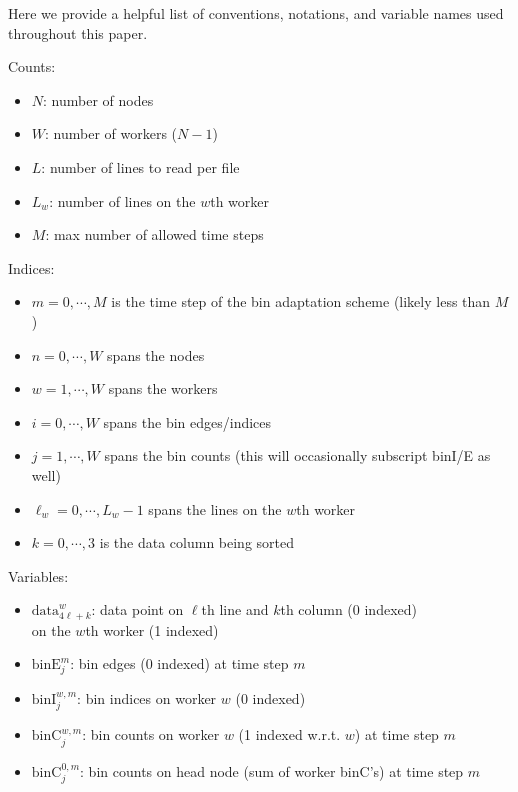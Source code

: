 \documentclass{article}
\begin{document}
Here we provide a helpful list of conventions, notations, and variable names used throughout this paper.

\begin{mdframed}[backgroundcolor=blue!20]
	Counts:
	\setlength\itemsep{0.1pt}
	\setlength\parskip{0.1pt}
	\begin{itemize}
		\setlength\itemsep{0.1pt}
		\setlength\parskip{0.1pt}
		\item $N$: number of nodes
		\item $W$: number of workers ($N-1$)
		\item $L$: number of lines to read per file
		\item $L_w$: number of lines on the $w$th worker
		\item $M$: max number of allowed time steps
	\end{itemize}
\end{mdframed}

\begin{mdframed}[backgroundcolor=blue!20]
	Indices:
	\setlength\itemsep{0.1pt}
	\setlength\parskip{0.1pt}
	\begin{itemize}
		\setlength\itemsep{0.1pt}
		\setlength\parskip{0.1pt}
		\item $m = 0, \cdots, M$ is the time step of the bin adaptation scheme (likely less than $M$)
		\item $n = 0, \cdots, W$ spans the nodes
		\item $w = 1, \cdots, W$ spans the workers
		\item $i = 0, \cdots, W$ spans the bin edges/indices
		\item $j = 1, \cdots, W$ spans the bin counts (this will occasionally subscript binI/E as well)
		\item $\ell_w = 0, \cdots, L_w-1$ spans the lines on the $w$th worker
		\item $k = 0, \cdots, 3$ is the data column being sorted
	\end{itemize}
\end{mdframed}

\begin{mdframed}[backgroundcolor=blue!20]
	Variables:
	\setlength\itemsep{0.1pt}
	\setlength\parskip{0.1pt}
	\begin{itemize}
		\setlength\itemsep{0.1pt}
		\setlength\parskip{0.1pt}
		\item $\textrm{data}^w_{4\ell+k}$: data point on $\ell$th line and $k$th column (0 indexed)\\ on the $w$th worker (1 indexed)
		\item $\textrm{binE}^m_j$: bin edges (0 indexed) at time step $m$
		\item $\textrm{binI}^{w,m}_j$: bin indices on worker $w$ (0 indexed)
		\item $\textrm{binC}^{w,m}_j$: bin counts on worker $w$ (1 indexed w.r.t. $w$) at time step $m$
		\item $\textrm{binC}^{0,m}_j$: bin counts on head node (sum of worker binC's) at time step $m$
	\end{itemize}
\end{mdframed}
\end{document}
